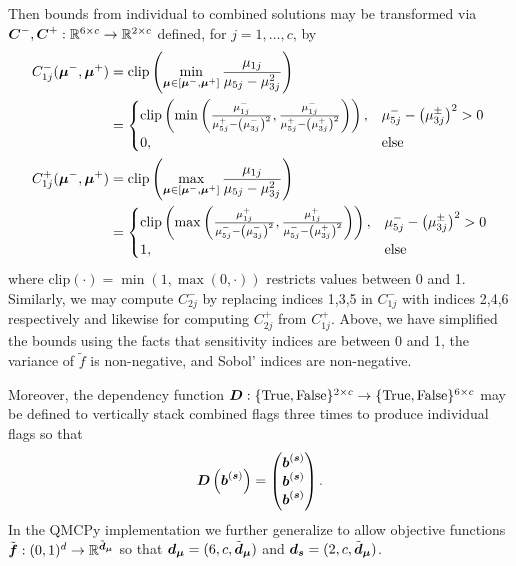 \documentclass{article}[12pt]
\begin{document}
Then bounds from individual to combined solutions may be transformed via $\boldsymbol{C}^-,\boldsymbol{C}^+:\mathbb{R}^{6 \times c} \to \mathbb{R}^{2 \times c}$ defined, for $j=1,\dots,c$, by  
\begin{align*}
    C_{1j}^-(\boldsymbol{\mu}^-,\boldsymbol{\mu}^+) 
    &= \text{clip}\left(\min_{\boldsymbol{\mu} \in [\boldsymbol{\mu}^-,\boldsymbol{\mu}^+]} \frac{\mu_{1j}}{\mu_{5j}-\mu_{3j}^2}\right) \\
    &= \begin{cases} 
        \text{clip}\left(\min\left(\frac{\mu_{1j}^-}{\mu_{5j}^+-\left(\mu_{3j}^-\right)^2},\frac{\mu_{1j}^-}{\mu_{5j}^+-\left(\mu_{3j}^+\right)^2}\right)\right), & \mu_{5j}^- - \left(\mu_{3j}^\pm\right)^2 >0 \\
        0, &\text{else}
    \end{cases} \\
    C_{1j}^+(\boldsymbol{\mu}^-,\boldsymbol{\mu}^+) 
    &= \text{clip}\left(\max_{\boldsymbol{\mu} \in [\boldsymbol{\mu}^-,\boldsymbol{\mu}^+]} \frac{\mu_{1j}}{\mu_{5j}-\mu_{3j}^2}\right) \\
    &= \begin{cases} 
        \text{clip}\left(\max\left(\frac{\mu_{1j}^+}{\mu_{5j}^--\left(\mu_{3j}^-\right)^2},\frac{\mu_{1j}^+}{\mu_{5j}^--\left(\mu_{3j}^+\right)^2}\right)\right), & \mu_{5j}^- - \left(\mu_{3j}^\pm\right)^2 >0 \\
        1, &\text{else}
    \end{cases}
\end{align*}
where $\text{clip}(\cdot) = \min(1,\max(0,\cdot))$ restricts values between 0 and 1. Similarly, we may compute $C_{2j}^-$ by replacing indices 1,3,5 in $C_{1j}^-$ with indices 2,4,6 respectively and likewise for computing $C_{2j}^+$ from $C_{1j}^+$. Above, we have simplified the bounds using the facts that sensitivity indices are between 0 and 1, the variance of $\tilde{f}$ is non-negative, and Sobol' indices are non-negative. 

Moreover, the dependency function $\boldsymbol{D}:\{\text{True},\text{False}\}^{2 \times c} \to \{\text{True},\text{False}\}^{6 \times c}$ may be defined to vertically stack combined flags three times to produce individual flags so that 
\begin{equation*}
    \boldsymbol{D}\left(\boldsymbol{b}^{(\boldsymbol{s})}\right) = \begin{pmatrix} \boldsymbol{b}^{(\boldsymbol{s})} \\ \boldsymbol{b}^{(\boldsymbol{s})} \\ \boldsymbol{b}^{(\boldsymbol{s})} \end{pmatrix}.
\end{equation*}
In the QMCPy implementation we further generalize to allow objective functions $\tilde{\boldsymbol{f}}: (0,1)^{d} \to \mathbb{R}^{\tilde{\boldsymbol{d}}_{\boldsymbol{\mu}}}$ so that $\boldsymbol{d}_{\boldsymbol{\mu}} = (6,c,\tilde{\boldsymbol{d}}_{\boldsymbol{\mu}})$ and $\boldsymbol{d}_{\boldsymbol{s}} = (2,c,\tilde{\boldsymbol{d}}_{\boldsymbol{\mu}})$.
\end{document}

